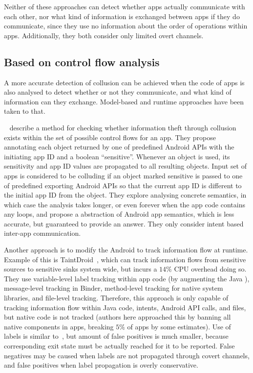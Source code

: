 \documentclass[article, oneside]{aaltoseries}
\renewcommand\gls\cgls
\begin{document}
Neither of these approaches can detect whether apps actually communicate with each other, nor what kind of information is exchanged between apps if they do communicate, since they use no information about the order of operations within apps. Additionally, they both consider only limited overt channels.

\subsection{Based on control flow analysis}
\label{sec:flow}

A more accurate detection of collusion can be achieved when the code of apps is also analysed to detect whether or not they communicate, and what kind of information can they exchange. Model-based and runtime approaches have been taken to that.

\citeauthor{Asavoae2018}~\cite{Asavoae2018} describe a method for checking whether information theft through collusion exists within the set of possible control flows for an app. They propose annotating each object returned by one of predefined Android APIs with the initiating app ID and a boolean ``sensitive''. Whenever an object is used, its sensitivity and app ID values are propagated to all resulting objects. Input set of apps is considered to be colluding if an object marked sensitive is passed to one of predefined exporting Android APIs so that the current app ID is different to the initial app ID from the object. They explore analysing concrete semantics, in which case the analysis takes longer, or even forever when the app code contains any loops, and propose a abstraction of Android app semantics, which is less accurate, but guaranteed to provide an answer. They only consider intent based inter-app communication.

Another approach is to modify the Android \gls{os} to track information flow at runtime. Example of this is TaintDroid~\cite{Enck2014}, which can track information flows from sensitive sources to sensitive sinks system wide, but incurs a $14\%$ CPU overhead doing so. They use variable-level label tracking within app code (by augmenting the Java \gls{vm}), message-level tracking in Binder, method-level tracking for native system libraries, and file-level tracking. Therefore, this approach is only capable of tracking information flow within Java code, intents, Android API calls, and files, but native code is not tracked (authors here approached this by banning all native components in apps, breaking $5\%$ of apps by some estimates). Use of labels is similar to~\cite{Asavoae2018}, but amount of false positives is much smaller, because corresponding exit state must be actually reached for it to be reported. False negatives may be caused when labels are not propagated through covert channels, and false positives when label propagation is overly conservative.
\end{document}
